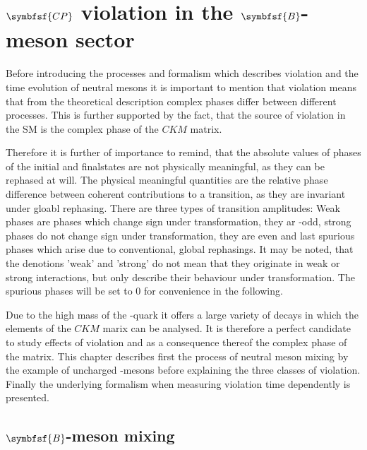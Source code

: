 \chapter[head={\CP violation in the $B$-meson sector},tocentry={$\symbfsf{C{}P}$ violation in the $\symbfsf{B}$-meson sector}]
{$\symbfsf{C{}P}$ violation in the $\symbfsf{B}$-meson sector}
\label{chap:CPV}

Before introducing the processes and formalism which describes \CP violation and the time evolution of neutral \B mesons it is important
to mention that \CP violation means that from the theoretical description complex phases differ between different processes. This is
further supported by the fact, that the source of \CP violation in the \ac{SM} is the complex phase of the $CKM$ matrix.

Therefore it is further of importance to remind, that the absolute values of phases of the initial and finalstates are not physically meaningful,
as they can be rephased at will. The physical meaningful quantities are the relative phase difference between coherent contributions to a transition,
as they are invariant under gloabl rephasing. There are three types of transition amplitudes: Weak phases are phases which change sign under \CP
transformation, they ar \CP-odd, strong phases do not change sign under \CP transformation, they are \CP even and last spurious phases which
arise due to conventional, global rephasings. It may be noted, that the denotions 'weak' and 'strong' do not mean that they originate in weak or strong
interactions, but only describe their behaviour under \CP transformation. The spurious phases will be set to \num{0} for convenience in the following.

Due to the high mass of the \bquark-quark it offers a large variety of decays in which the elements of the $CKM$ marix can be analysed.
It is therefore a perfect candidate to study effects of \CP violation and as a consequence thereof the complex phase of the matrix. This
chapter describes first the process of neutral meson mixing by the example of uncharged \B-mesons before explaining the
three classes of \CP violation. Finally the underlying formalism when measuring \CP violation time dependently is presented.

\section[head={$B$-meson mixing},tocentry={$B$-meson mixing}]{$\symbfsf{B}$-meson mixing}
\label{sec:Bmixing}

